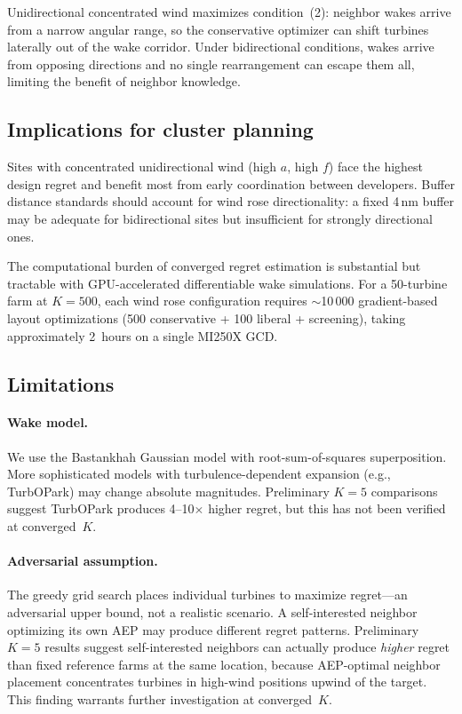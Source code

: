\documentclass[manuscript, 12pt]{copernicus}
\begin{document}
Unidirectional concentrated wind maximizes condition~(2): neighbor wakes arrive from a narrow angular range, so the conservative optimizer can shift turbines laterally out of the wake corridor.
Under bidirectional conditions, wakes arrive from opposing directions and no single rearrangement can escape them all, limiting the benefit of neighbor knowledge.

\subsection{Implications for cluster planning}

Sites with concentrated unidirectional wind (high $a$, high $f$) face the highest design regret and benefit most from early coordination between developers.
Buffer distance standards should account for wind rose directionality: a fixed 4\,nm buffer may be adequate for bidirectional sites but insufficient for strongly directional ones.

The computational burden of converged regret estimation is substantial but tractable with GPU-accelerated differentiable wake simulations.
For a 50-turbine farm at $K = 500$, each wind rose configuration requires $\sim$10\,000 gradient-based layout optimizations (500 conservative + 100 liberal + screening), taking approximately 2~hours on a single MI250X GCD.

\subsection{Limitations}

\paragraph{Wake model.} We use the Bastankhah Gaussian model with root-sum-of-squares superposition.
More sophisticated models with turbulence-dependent expansion (e.g., TurbOPark) may change absolute magnitudes.
Preliminary $K = 5$ comparisons suggest TurbOPark produces 4--10$\times$ higher regret, but this has not been verified at converged~$K$.

\paragraph{Adversarial assumption.} The greedy grid search places individual turbines to maximize regret---an adversarial upper bound, not a realistic scenario.
A self-interested neighbor optimizing its own AEP may produce different regret patterns.
Preliminary $K = 5$ results suggest self-interested neighbors can actually produce \emph{higher} regret than fixed reference farms at the same location, because AEP-optimal neighbor placement concentrates turbines in high-wind positions upwind of the target.
This finding warrants further investigation at converged~$K$.
\end{document}
